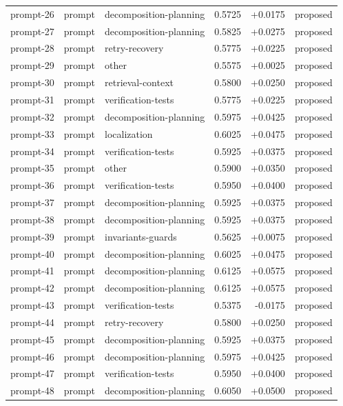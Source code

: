 \begin{center}
\begin{longtable}{llp{5.2cm}rrl}
prompt-26 & prompt & decomposition-planning & 0.5725 & +0.0175 & proposed \\
prompt-27 & prompt & decomposition-planning & 0.5825 & +0.0275 & proposed \\
prompt-28 & prompt & retry-recovery & 0.5775 & +0.0225 & proposed \\
prompt-29 & prompt & other & 0.5575 & +0.0025 & proposed \\
prompt-30 & prompt & retrieval-context & 0.5800 & +0.0250 & proposed \\
prompt-31 & prompt & verification-tests & 0.5775 & +0.0225 & proposed \\
prompt-32 & prompt & decomposition-planning & 0.5975 & +0.0425 & proposed \\
prompt-33 & prompt & localization & 0.6025 & +0.0475 & proposed \\
prompt-34 & prompt & verification-tests & 0.5925 & +0.0375 & proposed \\
prompt-35 & prompt & other & 0.5900 & +0.0350 & proposed \\
prompt-36 & prompt & verification-tests & 0.5950 & +0.0400 & proposed \\
prompt-37 & prompt & decomposition-planning & 0.5925 & +0.0375 & proposed \\
prompt-38 & prompt & decomposition-planning & 0.5925 & +0.0375 & proposed \\
prompt-39 & prompt & invariants-guards & 0.5625 & +0.0075 & proposed \\
prompt-40 & prompt & decomposition-planning & 0.6025 & +0.0475 & proposed \\
prompt-41 & prompt & decomposition-planning & 0.6125 & +0.0575 & proposed \\
prompt-42 & prompt & decomposition-planning & 0.6125 & +0.0575 & proposed \\
prompt-43 & prompt & verification-tests & 0.5375 & -0.0175 & proposed \\
prompt-44 & prompt & retry-recovery & 0.5800 & +0.0250 & proposed \\
prompt-45 & prompt & decomposition-planning & 0.5925 & +0.0375 & proposed \\
prompt-46 & prompt & decomposition-planning & 0.5975 & +0.0425 & proposed \\
prompt-47 & prompt & verification-tests & 0.5950 & +0.0400 & proposed \\
prompt-48 & prompt & decomposition-planning & 0.6050 & +0.0500 & proposed \\

\end{longtable}
\end{center}
